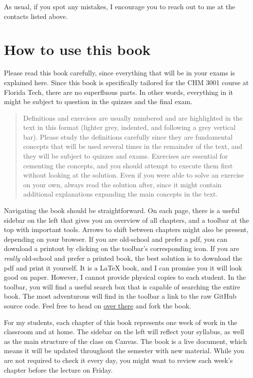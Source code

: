 \documentclass[
  9pt,
]{extbook}
\theoremstyle{definition}
\theoremstyle{definition}
\theoremstyle{definition}
\theoremstyle{remark}
\begin{document}
As usual, if you spot any mistakes, I encourage you to reach out to me at the contacts listed above.

\hypertarget{how-to-use-this-book}{%
\section*{How to use this book}\label{how-to-use-this-book}}

Please read this book carefully, since everything that will be in your exams is explained here.
Since this book is specifically tailored for the CHM 3001 course at Florida Tech, there are no superfluous parts. In other words, everything in it might be subject to question in the quizzes and the final exam.

\begin{quote}
Definitions and exercises are usually numbered and are highlighted in the text in this format (lighter grey, indented, and following a grey vertical bar). Please study the definitions carefully since they are fundamental concepts that will be used several times in the remainder of the text, and they will be subject to quizzes and exams. Exercises are essential for cementing the concepts, and you should attempt to execute them first without looking at the solution. Even if you were able to solve an exercise on your own, always read the solution after, since it might contain additional explanations expanding the main concepts in the text.
\end{quote}

Navigating the book should be straightforward. On each page, there is a useful sidebar on the left that gives you an overview of all chapters, and a toolbar at the top with important tools. Arrows to shift between chapters might also be present, depending on your browser. If you are old-school and prefer a pdf, you can download a printout by clicking on the toolbar's corresponding icon. If you are \emph{really} old-school and prefer a printed book, the best solution is to download the pdf and print it yourself. It is a LaTeX book, and I can promise you it will look good on paper. However, I cannot provide physical copies to each student. In the toolbar, you will find a useful search box that is capable of searching the entire book. The most adventurous will find in the toolbar a link to the raw GitHub source code. Feel free to head on \href{https://github.com/peverati/PChem1}{over there} and fork the book.

For my students, each chapter of this book represents one week of work in the classroom and at home. The sidebar on the left will reflect your syllabus, as well as the main structure of the class on Canvas. The book is a live document, which means it will be updated throughout the semester with new material. While you are not required to check it every day, you might want to review each week's chapter before the lecture on Friday.
\end{document}
